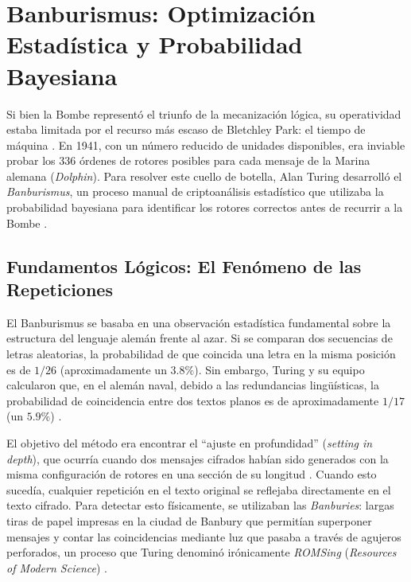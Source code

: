 \section{Banburismus: Optimización Estadística y Probabilidad Bayesiana}

Si bien la Bombe representó el triunfo de la mecanización lógica, su operatividad estaba limitada por el recurso más escaso de Bletchley Park: el tiempo de máquina \cite{copeland2004essential}. En 1941, con un número reducido de unidades disponibles, era inviable probar los 336 órdenes de rotores posibles para cada mensaje de la Marina alemana (\textit{Dolphin}). Para resolver este cuello de botella, Alan Turing desarrolló el \textit{Banburismus}, un proceso manual de criptoanálisis estadístico que utilizaba la probabilidad bayesiana para identificar los rotores correctos antes de recurrir a la Bombe \cite{copeland2006colossus, lahoz2012turing}.

\subsection{Fundamentos Lógicos: El Fenómeno de las Repeticiones}

El Banburismus se basaba en una observación estadística fundamental sobre la estructura del lenguaje alemán frente al azar. Si se comparan dos secuencias de letras aleatorias, la probabilidad de que coincida una letra en la misma posición es de $1/26$ (aproximadamente un $3.8\%$). Sin embargo, Turing y su equipo calcularon que, en el alemán naval, debido a las redundancias lingüísticas, la probabilidad de coincidencia entre dos textos planos es de aproximadamente $1/17$ (un $5.9\%$) \cite{copeland2004essential, copeland2006colossus}.

El objetivo del método era encontrar el ``ajuste en profundidad'' (\textit{setting in depth}), que ocurría cuando dos mensajes cifrados habían sido generados con la misma configuración de rotores en una sección de su longitud \cite{copeland2004essential}. Cuando esto sucedía, cualquier repetición en el texto original se reflejaba directamente en el texto cifrado. Para detectar esto físicamente, se utilizaban las \textit{Banburies}: largas tiras de papel impresas en la ciudad de Banbury que permitían superponer mensajes y contar las coincidencias mediante luz que pasaba a través de agujeros perforados, un proceso que Turing denominó irónicamente \textit{ROMSing} (\textit{Resources of Modern Science}) \cite{hodges2014turing, lahoz2012turing}.


